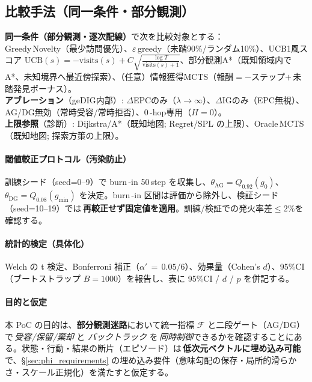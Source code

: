 \documentclass[ja=standard,xelatex]{bxjsarticle}
\newcommand{\F}{\mathcal{F}}
\begin{document}
\subsection{比較手法（同一条件・部分観測）}\label{sec:maze_baselines}
\textbf{同一条件（部分観測・逐次配線）}で次を比較対象とする：\\
Greedy\,Novelty（最少訪問優先）、$\varepsilon$\,greedy（未踏90\%/ランダム10\%）、UCB1風スコア\; $\mathrm{UCB}(s){=}{-}\mathrm{visits}(s){+}C\sqrt{\tfrac{\log T}{\mathrm{visits}(s){+}1}}$、部分観測A*（既知領域内でA*、未知境界へ最近傍探索）、（任意）情報獲得MCTS（報酬$={-}$ステップ$+\,$未踏発見ボーナス）。\\
\textbf{アブレーション}（geDIG内部）: $\Delta$EPCのみ（$\lambda\to\infty$）、$\Delta$IGのみ（EPC無視）、AG/DG無効（常時受容/常時拒否）、0\,\mbox{-}hop専用（$H{=}0$）。\\
\textbf{上限参照}（診断）: Dijkstra/A*（既知地図; Regret/SPL の上限）、Oracle\,MCTS（既知地図; 探索方策の上限）。

\paragraph{閾値較正プロトコル（汚染防止）}\label{sec:threshold_calibration_protocol}
訓練シード（seed=0--9）で burn\,\mbox{-}in 50\,step を収集し、$\theta_{\mathrm{AG}}{=}Q_{0.92}(g_0)$、$\theta_{\mathrm{DG}}{=}Q_{0.08}(g_{\min})$ を決定。burn\,\mbox{-}in 区間は評価から除外し、検証シード（seed=10--19）では\,\textbf{再較正せず固定値を適用}。訓練/検証での発火率差$\le2$\%を確認する。

\paragraph{統計的検定（具体化）}\label{sec:statistical_testing_maze}
Welch の t 検定、Bonferroni 補正（$\alpha'\,{=}\,0.05/6$）、効果量（Cohen's $d$）、95\%CI（ブートストラップ $B{=}1000$）を報告し、表に 95\%CI / $d$ / $p$ を併記する。

\paragraph{目的と仮定}
本 PoC の目的は、\textbf{部分観測迷路}において統一指標 $\F$ と二段ゲート（AG/DG）で\,\emph{受容/保留/棄却} と \emph{バックトラック} を\,\emph{同時制御}できるかを確認することにある。状態・行動・結果の断片（エピソード）は\,\textbf{低次元ベクトルに埋め込み可能}で、\S\ref{sec:phi_requirements} の埋め込み要件（意味勾配の保存・局所的滑らかさ・スケール正規化）を満たすと仮定する。
\end{document}
